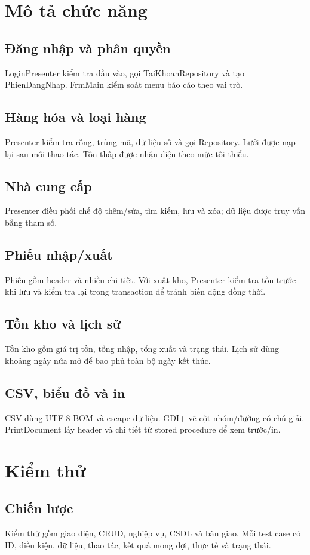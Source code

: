 \documentclass[12pt,a4paper]{report}
\begin{document}
\chapter{Mô tả chức năng}
\section{Đăng nhập và phân quyền}
LoginPresenter kiểm tra đầu vào, gọi TaiKhoanRepository và tạo PhienDangNhap.
FrmMain kiểm soát menu báo cáo theo vai trò.
\section{Hàng hóa và loại hàng}
Presenter kiểm tra rỗng, trùng mã, dữ liệu số và gọi Repository. Lưới được nạp
lại sau mỗi thao tác. Tồn thấp được nhận diện theo mức tối thiểu.
\section{Nhà cung cấp}
Presenter điều phối chế độ thêm/sửa, tìm kiếm, lưu và xóa; dữ liệu được truy vấn
bằng tham số.
\section{Phiếu nhập/xuất}
Phiếu gồm header và nhiều chi tiết. Với xuất kho, Presenter kiểm tra tồn trước
khi lưu và kiểm tra lại trong transaction để tránh biến động đồng thời.
\section{Tồn kho và lịch sử}
Tồn kho gồm giá trị tồn, tổng nhập, tổng xuất và trạng thái. Lịch sử dùng khoảng
ngày nửa mở để bao phủ toàn bộ ngày kết thúc.
\section{CSV, biểu đồ và in}
CSV dùng UTF-8 BOM và escape dữ liệu. GDI+ vẽ cột nhóm/đường có chú giải.
PrintDocument lấy header và chi tiết từ stored procedure để xem trước/in.

\chapter{Kiểm thử}
\section{Chiến lược}
Kiểm thử gồm giao diện, CRUD, nghiệp vụ, CSDL và bàn giao. Mỗi test case có ID,
điều kiện, dữ liệu, thao tác, kết quả mong đợi, thực tế và trạng thái.
\end{document}
